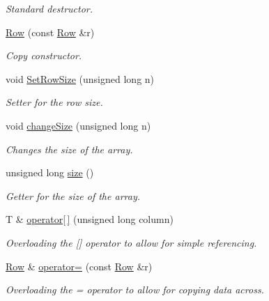 \begin{DoxyCompactItemize}
\begin{DoxyCompactList}\small\item\em Standard destructor. \end{DoxyCompactList}\item 
\hyperlink{class_row_a3c76905ddd4522c92da0d8a9e24a22a1}{Row} (const \hyperlink{class_row}{Row} \&r)
\begin{DoxyCompactList}\small\item\em Copy constructor. \end{DoxyCompactList}\item 
void \hyperlink{class_row_a1d40c45a688cb831eb642cc1790469a2}{Set\+Row\+Size} (unsigned long n)
\begin{DoxyCompactList}\small\item\em Setter for the row size. \end{DoxyCompactList}\item 
void \hyperlink{class_row_a6a19d7810876be81ad91cdb779b0d9a9}{change\+Size} (unsigned long n)
\begin{DoxyCompactList}\small\item\em Changes the size of the array. \end{DoxyCompactList}\item 
unsigned long \hyperlink{class_row_a5fdbcb2478b0ff00d12b8b109b0eb89a}{size} ()
\begin{DoxyCompactList}\small\item\em Getter for the size of the array. \end{DoxyCompactList}\item 
T \& \hyperlink{class_row_aecb642c8ceffbb7d6c69bc13d9de4bb0}{operator\mbox{[}$\,$\mbox{]}} (unsigned long column)
\begin{DoxyCompactList}\small\item\em Overloading the \mbox{[}\mbox{]} operator to allow for simple referencing. \end{DoxyCompactList}\item 
\hyperlink{class_row}{Row} \& \hyperlink{class_row_a877484e061eef2a179cc28d30b3ec542}{operator=} (const \hyperlink{class_row}{Row} \&r)
\begin{DoxyCompactList}\small\item\em Overloading the = operator to allow for copying data across. \end{DoxyCompactList}\end{DoxyCompactItemize}
